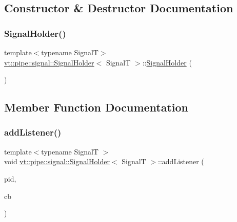 \subsection{Constructor \& Destructor Documentation}
\mbox{\label{structvt_1_1pipe_1_1signal_1_1_signal_holder_a9b8fde895ed00689216a5e4a7540cefa}} 
\subsubsection{\texorpdfstring{Signal\+Holder()}{SignalHolder()}}
{\footnotesize\ttfamily template$<$typename SignalT$>$ \\
\hyperlink{structvt_1_1pipe_1_1signal_1_1_signal_holder}{vt\+::pipe\+::signal\+::\+Signal\+Holder}$<$ SignalT $>$\+::\hyperlink{structvt_1_1pipe_1_1signal_1_1_signal_holder}{Signal\+Holder} (\begin{DoxyParamCaption}{ }\end{DoxyParamCaption})\hspace{0.3cm}{\ttfamily [inline]}}



\subsection{Member Function Documentation}
\mbox{\label{structvt_1_1pipe_1_1signal_1_1_signal_holder_aee30c3b7c07d695450e1d6a9953ee98a}} 
\subsubsection{\texorpdfstring{add\+Listener()}{addListener()}}
{\footnotesize\ttfamily template$<$typename SignalT $>$ \\
void \hyperlink{structvt_1_1pipe_1_1signal_1_1_signal_holder}{vt\+::pipe\+::signal\+::\+Signal\+Holder}$<$ SignalT $>$\+::add\+Listener (\begin{DoxyParamCaption}\item[{\hyperlink{namespacevt_ac9852acda74d1896f48f406cd72c7bd3}{Pipe\+Type} const \&}]{pid,  }\item[{\hyperlink{structvt_1_1pipe_1_1signal_1_1_signal_holder_a23af418129e6e8ecb4ee9621e6fd6f90}{Listener\+Type} \&\&}]{cb }\end{DoxyParamCaption})}

